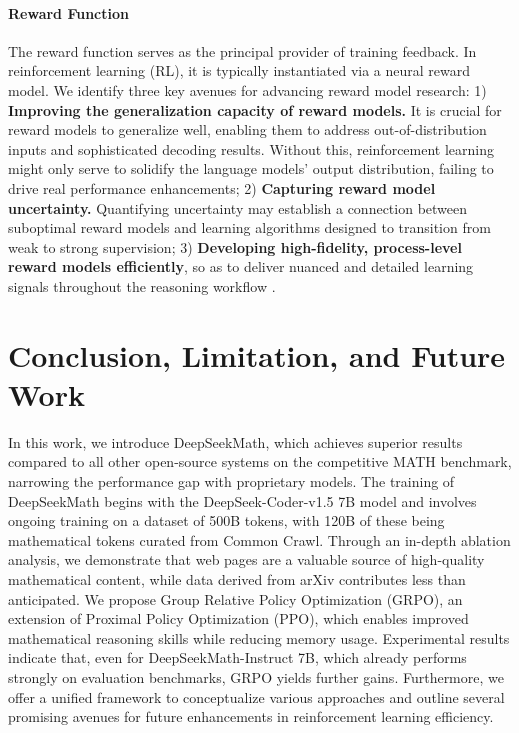 \begin{itemize}[topsep=0pt]
\begin{itemize}[topsep=0pt]
\paragraph{Reward Function} The reward function serves as the principal provider of training feedback. In reinforcement learning (RL), it is typically instantiated via a neural reward model. We identify three key avenues for advancing reward model research: 1) \textbf{Improving the generalization capacity of reward models.} It is crucial for reward models to generalize well, enabling them to address out-of-distribution inputs and sophisticated decoding results. Without this, reinforcement learning might only serve to solidify the language models' output distribution, failing to drive real performance enhancements; 2) \textbf{Capturing reward model uncertainty.} Quantifying uncertainty may establish a connection between suboptimal reward models and learning algorithms designed to transition from weak to strong supervision; 3) \textbf{Developing high-fidelity, process-level reward models efficiently}, so as to deliver nuanced and detailed learning signals throughout the reasoning workflow \citep{lightman2023let,wang2023math}.

\section{Conclusion, Limitation, and Future Work}

In this work, we introduce DeepSeekMath, which achieves superior results compared to all other open-source systems on the competitive MATH benchmark, narrowing the performance gap with proprietary models. The training of DeepSeekMath begins with the DeepSeek-Coder-v1.5 7B model and involves ongoing training on a dataset of 500B tokens, with 120B of these being mathematical tokens curated from Common Crawl. Through an in-depth ablation analysis, we demonstrate that web pages are a valuable source of high-quality mathematical content, while data derived from arXiv contributes less than anticipated. We propose Group Relative Policy Optimization (GRPO), an extension of Proximal Policy Optimization (PPO), which enables improved mathematical reasoning skills while reducing memory usage. Experimental results indicate that, even for DeepSeekMath-Instruct 7B, which already performs strongly on evaluation benchmarks, GRPO yields further gains. Furthermore, we offer a unified framework to conceptualize various approaches and outline several promising avenues for future enhancements in reinforcement learning efficiency.


\end{itemize}
\end{itemize}
